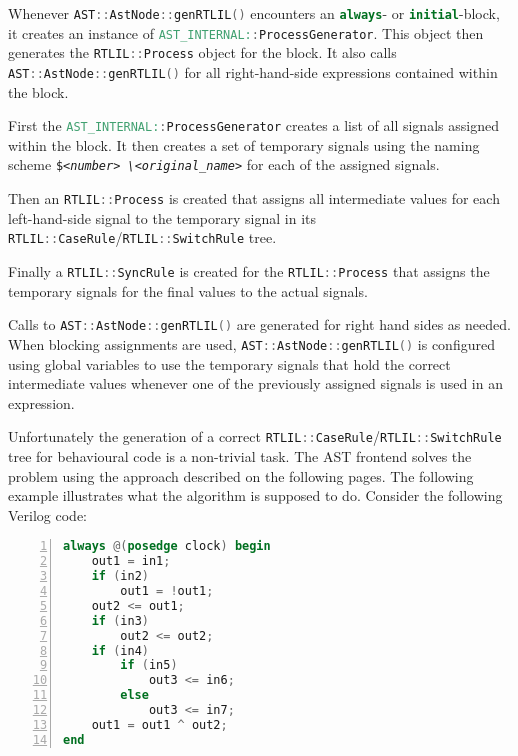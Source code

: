 \begin{itemize}
\item Whenever \lstinline[language=C++]{AST::AstNode::genRTLIL()} encounters an \lstinline[language=Verilog]{always}-
or \lstinline[language=Verilog]{initial}-block, it creates an instance of
\lstinline[language=Verilog]{AST_INTERNAL::ProcessGenerator}. This object then generates the
\lstinline[language=C++]{RTLIL::Process} object for the block. It also calls \lstinline[language=C++]{AST::AstNode::genRTLIL()}
for all right-hand-side expressions contained within the block.
%
\begin{sloppypar}
\item First the  \lstinline[language=Verilog]{AST_INTERNAL::ProcessGenerator} creates a list of all signals assigned
within the block. It then creates a set of temporary signals using the naming scheme {\tt \$\it<number>\tt
\textbackslash\it <original\_name>} for each of the assigned signals.
\end{sloppypar}
%
\item Then an \lstinline[language=C++]{RTLIL::Process} is created that assigns all intermediate values for each left-hand-side
signal to the temporary signal in its \lstinline[language=C++]{RTLIL::CaseRule}/\lstinline[language=C++]{RTLIL::SwitchRule} tree.
%
\item Finally a \lstinline[language=C++]{RTLIL::SyncRule} is created for the \lstinline[language=C++]{RTLIL::Process} that
assigns the temporary signals for the final values to the actual signals.
%
\item Calls to \lstinline[language=C++]{AST::AstNode::genRTLIL()} are generated for right hand sides as needed. When blocking
assignments are used, \lstinline[language=C++]{AST::AstNode::genRTLIL()} is configured using global variables to use
the temporary signals that hold the correct intermediate values whenever one of the previously assigned signals is used
in an expression.
\end{itemize}

Unfortunately the generation of a correct \lstinline[language=C++]{RTLIL::CaseRule}/\lstinline[language=C++]{RTLIL::SwitchRule}
tree for behavioural code is a non-trivial task. The AST frontend solves the problem using the approach described on the following
pages. The following example illustrates what the algorithm is supposed to do. Consider the following Verilog code:

\begin{lstlisting}[numbers=left,frame=single,language=Verilog]
always @(posedge clock) begin
	out1 = in1;
	if (in2)
		out1 = !out1;
	out2 <= out1;
	if (in3)
		out2 <= out2;
	if (in4)
		if (in5)
			out3 <= in6;
		else
			out3 <= in7;
	out1 = out1 ^ out2;
end
\end{lstlisting}

